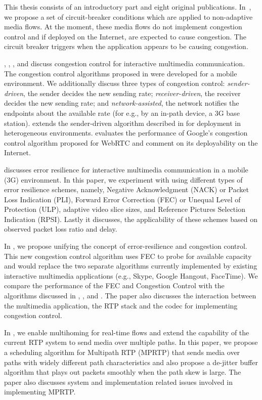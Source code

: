 This thesis consists of an introductory part and eight original publications.
In~, we propose a set of circuit-breaker conditions which are
applied to non-adaptive media flows. At the moment, these media flows do not
implement congestion control and if deployed on the Internet, are expected to
cause congestion. The circuit breaker triggers when the application appears to
be causing congestion.

, , , and 
discuss congestion control for interactive multimedia communication. The
congestion control algorithms proposed in  were developed for
a mobile environment. We additionally discuss three types of congestion
control:  \emph{sender-driven}, the sender decides the new sending rate; 
\emph{receiver-driven}, the receiver decides the new sending rate; and 
\emph{network-assisted}, the network notifies the endpoints about the available
rate (for e.g., by an in-path device, a 3G base station). 
extends the sender-driven algorithm described in  for
deployment in heterogeneous environments.  evaluates the
performance of Google's congestion control algorithm proposed for WebRTC and
comment on its deployability on the Internet.

 discusses error resilience for interactive multimedia
communication in a mobile (3G) environment. In this paper, we experiment with
using different types of error resilience schemes, namely, Negative
Acknowledgment (NACK) or Packet Loss Indication (PLI), Forward Error
Correction (FEC) or Unequal Level of Protection (ULP), adaptive video slice
sizes, and Reference Pictures Selection Indication (RPSI). Lastly it
discusses, the applicability of these schemes based on observed packet loss
ratio and delay.

In , we propose unifying the concept of error-resilience and
congestion control. This new congestion control algorithm uses FEC to probe
for available capacity and would replace the two separate algorithms currently
implemented by existing interactive multimedia applications (e.g., Skype,
Google Hangout, FaceTime). We compare the performance of the FEC and
Congestion Control with the algorithms discussed in ,
, and . The paper also discusses the
interaction between the multimedia application, the RTP stack and the codec
for implementing congestion control.


In , we enable multihoming for real-time flows and extend the
capability of the current RTP system to send media over multiple paths. In
this paper, we propose a scheduling algorithm for Multipath RTP (MPRTP) that
sends media over paths with widely different path characteristics and also
propose a de-jitter buffer algorithm that plays out packets smoothly when the
path skew is large. The paper also discusses system and implementation related
issues involved in implementing MPRTP.


